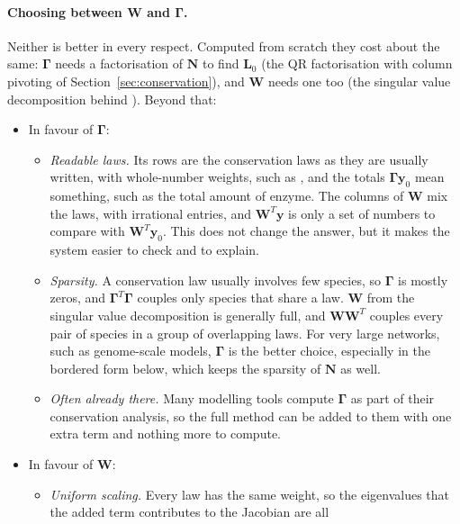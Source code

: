 \documentclass[11pt,a4paper,openany]{report}
\begin{document}
{{\paragraph{Choosing between $\mathbf{W}$ and $\mathbf{\Gamma}$.} Neither is
better in every respect. Computed from scratch they cost about the same:
$\mathbf{\Gamma}$ needs a factorisation of $\mathbf{N}$ to find
$\mathbf{L}_0$ (the QR factorisation with column pivoting of
Section~\ref{sec:conservation}), and $\mathbf{W}$ needs one too (the
singular value decomposition behind ). Beyond that:

\begin{itemize}
\item In favour of $\mathbf{\Gamma}$:
  \begin{itemize}
  \item \emph{Readable laws.} Its rows are the conservation laws as they are
    usually written, with whole-number weights, such as , and
    the totals $\mathbf{\Gamma}\mathbf{y}_0$ mean something, such as the
    total amount of enzyme. The columns of $\mathbf{W}$ mix the laws, with
    irrational entries, and $\mathbf{W}^T\mathbf{y}$ is only a set of
    numbers to compare with $\mathbf{W}^T\mathbf{y}_0$. This does not change
    the answer, but it makes the system easier to check and to explain.
  \item \emph{Sparsity.} A conservation law usually involves few species, so
    $\mathbf{\Gamma}$ is mostly zeros, and $\mathbf{\Gamma}^T\mathbf{\Gamma}$
    couples only species that share a law. $\mathbf{W}$ from the singular
    value decomposition is generally full, and $\mathbf{W}\mathbf{W}^T$
    couples every pair of species in a group of overlapping laws. For very
    large networks, such as genome-scale models, $\mathbf{\Gamma}$ is the
    better choice, especially in the bordered form below, which keeps the
    sparsity of $\mathbf{N}$ as well.
  \item \emph{Often already there.} Many modelling tools compute
    $\mathbf{\Gamma}$ as part of their conservation analysis, so the full
    method can be added to them with one extra term and nothing more to
    compute.
  \end{itemize}
\item In favour of $\mathbf{W}$:
  \begin{itemize}
  \item \emph{Uniform scaling.} Every law has the same weight, so the
    eigenvalues that the added term contributes to the Jacobian are all

\end{itemize}
\end{itemize}}}
\end{document}
